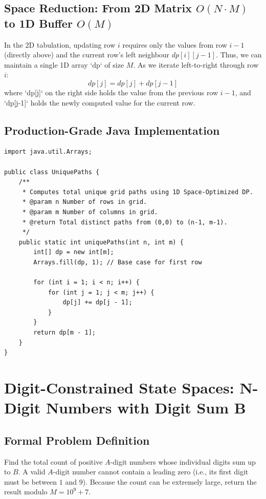 \documentclass[10pt,journal,compsoc,onecolumn]{IEEEtran}
\begin{document}
\subsection{Space Reduction: From 2D Matrix $O(N \cdot M)$ to 1D Buffer $O(M)$}

In the 2D tabulation, updating row $i$ requires only the values from row $i-1$ (directly above) and the current row's left neighbour $dp[i][j-1]$. Thus, we can maintain a single 1D array `dp` of size $M$. As we iterate left-to-right through row $i$:
\[
dp[j] = dp[j] + dp[j-1]
\]
where `dp[j]` on the right side holds the value from the previous row $i-1$, and `dp[j-1]` holds the newly computed value for the current row.

\subsection{Production-Grade Java Implementation}

\begin{verbatim}
import java.util.Arrays;

public class UniquePaths {
    /**
     * Computes total unique grid paths using 1D Space-Optimized DP.
     * @param n Number of rows in grid.
     * @param m Number of columns in grid.
     * @return Total distinct paths from (0,0) to (n-1, m-1).
     */
    public static int uniquePaths(int n, int m) {
        int[] dp = new int[m];
        Arrays.fill(dp, 1); // Base case for first row

        for (int i = 1; i < n; i++) {
            for (int j = 1; j < m; j++) {
                dp[j] += dp[j - 1];
            }
        }
        return dp[m - 1];
    }
}
\end{verbatim}

\section{Digit-Constrained State Spaces: N-Digit Numbers with Digit Sum B}
\label{sec:n-digit-numbers}

\subsection{Formal Problem Definition}

Find the total count of positive $A$-digit numbers whose individual digits sum up to $B$. A valid $A$-digit number cannot contain a leading zero (i.e., its first digit must be between $1$ and $9$). Because the count can be extremely large, return the result modulo $M = 10^9 + 7$.
\end{document}
